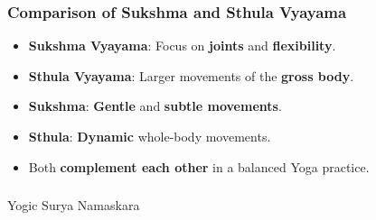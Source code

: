 \begin{frame}[fragile]\frametitle{Comparison of Sukshma and Sthula Vyayama}

      \begin{itemize}
        \item \textbf{Sukshma Vyayama}: Focus on \textbf{joints} and \textbf{flexibility}.
        \item \textbf{Sthula Vyayama}: Larger movements of the \textbf{gross body}.
        \item \textbf{Sukshma}: \textbf{Gentle} and \textbf{subtle movements}.
        \item \textbf{Sthula}: \textbf{Dynamic} whole-body movements.
        \item Both \textbf{complement each other} in a balanced Yoga practice.
      \end{itemize}

\end{frame}


\begin{frame}[fragile]\frametitle{}
\begin{center}
{\Large Yogic Surya Namaskara}
\end{center}
\end{frame}

